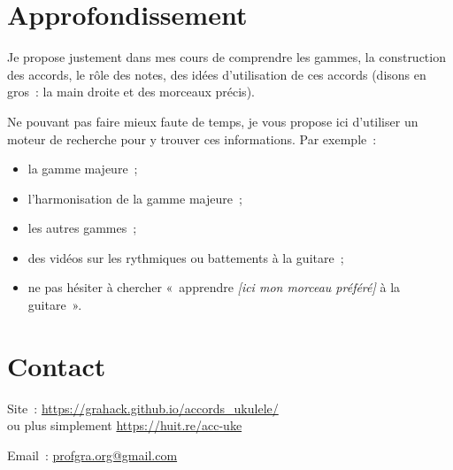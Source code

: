 \documentclass[11pt]{article}
\begin{document}
\section{Approfondissement} \label{approf}

Je propose justement dans mes cours de comprendre les gammes, la construction
des accords, le rôle des notes, des idées d’utilisation de ces accords (disons
en gros~: la main droite et des morceaux précis).

Ne pouvant pas faire mieux faute de temps, je vous propose ici d’utiliser un
moteur de recherche pour y trouver ces informations. Par exemple~:

\begin{itemize}
\item la gamme majeure~;
\item l’harmonisation de la gamme majeure~;
\item les autres gammes~;
\item des vidéos sur les rythmiques ou battements à la guitare~;
\item ne pas hésiter à chercher «~apprendre \textit{[ici mon morceau préféré]}
       à la guitare~».
\end{itemize}

\section{Contact} \label{contact}

\setlength{\parindent}{0pt}

Site~: \url{https://grahack.github.io/accords_ukulele/} \\
ou plus simplement \url{https://huit.re/acc-uke}

Email~: \url{profgra.org@gmail.com}
\end{document}
